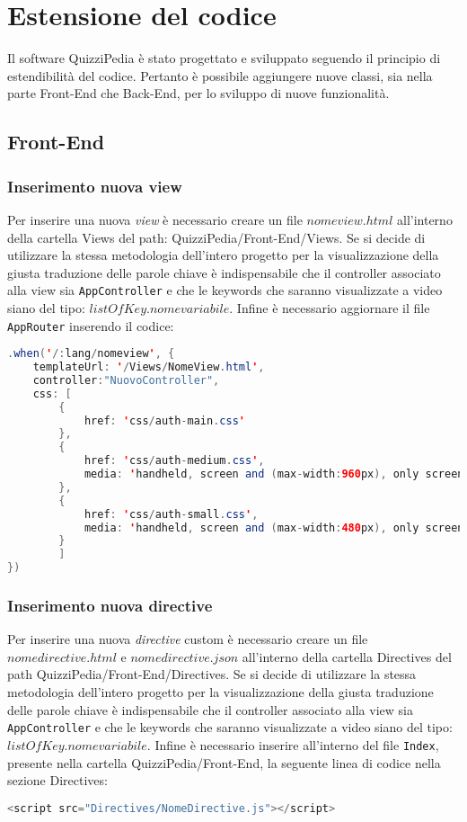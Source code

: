 \newpage
\section{Estensione del codice}
Il software QuizziPedia è stato progettato e sviluppato seguendo il principio di estendibilità del codice. Pertanto è possibile aggiungere nuove classi, sia nella parte Front-End che Back-End, per lo sviluppo di nuove funzionalità.

\subsection{Front-End}

\subsubsection{Inserimento nuova view}
Per inserire una nuova \textit{view} è necessario creare un file $nomeview.html$ all'interno della cartella Views del path: QuizziPedia/Front-End/Views. Se si decide di utilizzare la stessa metodologia dell'intero progetto per la visualizzazione della giusta traduzione delle parole chiave è indispensabile che il controller associato alla view sia \texttt{AppController} e che le keywords che saranno visualizzate a video siano del tipo: \texttt{$listOfKey.nomevariabile$}. Infine è necessario aggiornare il file \texttt{AppRouter} inserendo il codice:

\begin{lstlisting}[language=Java,firstnumber=1]
.when('/:lang/nomeview', {
	templateUrl: '/Views/NomeView.html',
	controller:"NuovoController",
	css: [
		{
			href: 'css/auth-main.css'
		},
		{
			href: 'css/auth-medium.css',
			media: 'handheld, screen and (max-width:960px), only screen and (max-device-width:960px)'
		},
		{
			href: 'css/auth-small.css',
			media: 'handheld, screen and (max-width:480px), only screen and (max-device-width:480px)'
		}
		]
})
\end{lstlisting}

\subsubsection{Inserimento nuova directive}
Per inserire una nuova \textit{directive} custom è necessario creare un file $nomedirective.html$ e $nomedirective.json$ all'interno della cartella Directives del path QuizziPedia/Front-End/Directives. Se si decide di utilizzare la stessa metodologia dell'intero progetto per la visualizzazione della giusta traduzione delle parole chiave è indispensabile che il controller associato alla view sia \texttt{AppController} e che le keywords che saranno visualizzate a video siano del tipo: \texttt{$listOfKey.nomevariabile$}. Infine è necessario inserire all'interno del file \texttt{Index}, presente nella cartella QuizziPedia/Front-End, la seguente linea di codice nella sezione Directives:
\begin{lstlisting}[language=Java,firstnumber=1]
	<script src="Directives/NomeDirective.js"></script>
\end{lstlisting}


